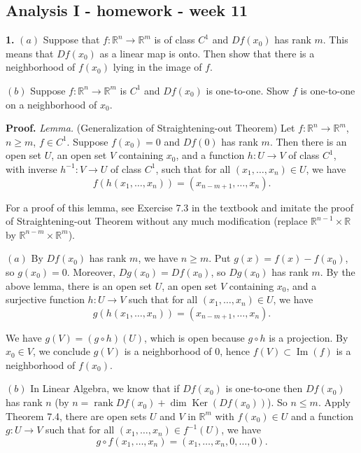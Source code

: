 \documentclass{article}
\begin{document}
    
    
    
    
    

    
    \subsection*{Analysis I - homework - week
11}\label{analysis-i---homework---week-11}

    \textbf{1.} $(a)$ Suppose that $f : \mathbb{R}^n \to \mathbb{R}^m$ is of
class $C^1$ and $Df (x_0 )$ has rank $m$. This means that $Df (x_0 )$ as
a linear map is onto. Then show that there is a neighborhood of $f(x_0)$
lying in the image of $f$.

$(b)$ Suppose $f : \mathbb{R}^n \to \mathbb{R}^m$ is $C^1$ and
$Df (x_0 )$ is one-to-one. Show $f$ is one-to-one on a neighborhood of
$x_0$.

    \textbf{Proof.} \emph{Lemma.} (Generalization of Straightening-out
Theorem) Let $f: \mathbb{R}^n \to \mathbb{R}^m$, $n\ge m$, $f \in C^1$.
Suppose $f(x_0) = 0$ and $Df(0)$ has rank $m$. Then there is an open set
$U$, an open set $V$ containing $x_0$, and a function $h:U\to V$ of
class $C^1$, with inverse $h^{-1}:V\to U$ of class $C^1$, such that for
all $(x_1,\ldots,x_n)\in U$, we have
\[f(h(x_1,\ldots,x_n)) = (x_{n-m+1},\ldots,x_n).\]

For a proof of this lemma, see Exercise 7.3 in the textbook and imitate
the proof of Straightening-out Theorem without any much modification
(replace $\mathbb{R}^{n-1}\times \mathbb{R}$ by
$\mathbb{R}^{n-m}\times \mathbb{R}^m$).

$(a)$ By $Df(x_0)$ has rank $m$, we have $n \ge m$. Put
$g(x) = f(x) - f(x_0)$, so $g(x_0) = 0$. Moreover, $Dg(x_0) = Df(x_0)$,
so $Dg(x_0)$ has rank $m$. By the above lemma, there is an open set $U$,
an open set $V$ containing $x_0$, and a surjective function $h:U\to V$
such that for all $(x_1,\ldots,x_n)\in U$, we have
\[g(h(x_1,\ldots,x_n)) = (x_{n-m+1},\ldots,x_n).\]

We have $g(V) = (g\circ h) (U)$, which is open because $g\circ h$ is a
projection. By $x_0 \in V$, we conclude $g(V)$ is a neighborhood of $0$,
hence $f(V)\subset \operatorname{Im}(f)$ is a neighborhood of $f(x_0)$.

$(b)$ In Linear Algebra, we know that if $Df(x_0)$ is one-to-one then
$Df(x_0)$ has rank $n$ (by
$n = \operatorname{rank}Df(x_0) + \dim \operatorname{Ker}( Df(x_0))$).
So $n\le m$. Apply Theorem 7.4, there are open sets $U$ and $V$ in
$\mathbb{R}^m$ with $f(x_0)\in U$ and a function $g:U\to V$ such that
for all $(x_1,\ldots,x_n)\in f^{-1}(U)$, we have
\[g\circ  f(x_1,\ldots,x_n) = (x_1,\ldots,x_n,0,\ldots,0).\]
\end{document}
